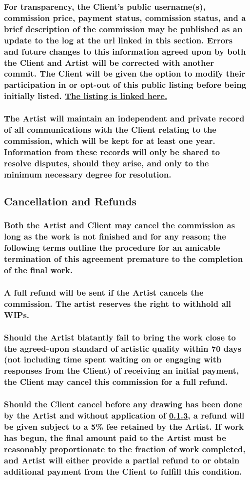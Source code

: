 \documentclass{article}
\newcommand{\subs}[2][]{\subsubsection[#1]{\normalfont #2}}
\begin{document}
\begin{flushleft}
		\subs[Public Recordkeeping]{For transparency, the Client's public username(s), commission price, payment status, commission status, and a brief description of the commission may be published as an update to the log at the url linked in this section. Errors and future changes to this information agreed upon by both the Client and Artist will be corrected with another commit. The Client will be given the option to modify their participation in or opt-out of this public listing before being initially listed. \href{https://github.com/AlexRandomkat/alexrandomkatCommLog/blob/main/alexrandomkat-commlog-PUBLIC.pdf}{The listing is linked here.}}
		
		\subs[Private Recordkeeping]{The Artist will maintain an independent and private record of all communications with the Client relating to the commission, which will be kept for at least one year. Information from these records will only be shared to resolve disputes, should they arise, and only to the minimum necessary degree for resolution.}
		\hphantom{owo}
		
	\leftskip=1cm
	\subsection{Cancellation and Refunds}
	\leftskip=2cm

		\subs[At-will Termination]{Both the Artist and Client may cancel the commission as long as the work is not finished and for any reason; the following terms outline the procedure for an amicable termination of this agreement premature to the completion of the final work.}
		
		\subs[Cancellation by the Artist]{A full refund will be sent if the Artist cancels the commission. The artist reserves the right to withhold all WIPs.}
		
		\subs[Failure to Complete by Deadline]{Should the Artist blatantly fail to bring the work close to the agreed-upon standard of artistic quality within 70 days (not including time spent waiting on or engaging with responses from the Client) of receiving an initial payment, the Client may cancel this commission for a full refund.}\label{failuretocomplete}
		
		\subs[Cancellation by the Client]{Should the Client cancel before any drawing has been done by the Artist and without application of \ref{failuretocomplete}, a refund will be given subject to a 5\% fee retained by the Artist. If work has begun, the final amount paid to the Artist must be reasonably proportionate to the fraction of work completed, and Artist will either provide a partial refund to or obtain additional payment from the Client to fulfill this condition.}


\end{flushleft}
\end{document}
